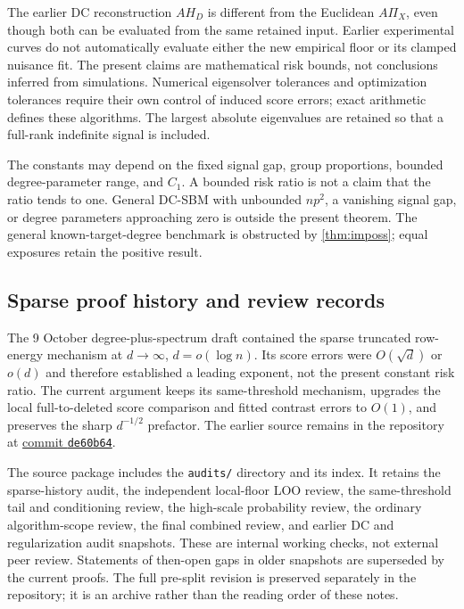 The earlier DC reconstruction $AH_D$ is different from the Euclidean
$A\Pi_X$, even though both can be evaluated from the same retained
input. Earlier experimental curves do not automatically evaluate either
the new empirical floor or its clamped nuisance fit. The present claims
are mathematical risk bounds, not conclusions inferred from simulations.
Numerical eigensolver tolerances and optimization tolerances require their
own control of induced score errors; exact arithmetic defines these
algorithms. The largest absolute eigenvalues are retained so that a
full-rank indefinite signal is included.

The constants may depend on the fixed signal gap, group proportions,
bounded degree-parameter range, and $C_1$. A bounded risk ratio is not
a claim that the ratio tends to one. General DC-SBM with unbounded
$np^2$, a vanishing signal gap, or degree parameters approaching zero
is outside the present theorem. The general known-target-degree
benchmark is obstructed by \cref{thm:imposs}; equal exposures retain
the positive result.

\subsection{Sparse proof history and review records}
The 9 October degree-plus-spectrum draft contained the sparse truncated
row-energy mechanism at $d\to\infty$, $d=o(\log n)$. Its score errors
were $O(\sqrt d)$ or $o(d)$ and therefore established a leading exponent,
not the present constant risk ratio. The current argument keeps its
same-threshold mechanism, upgrades the local full-to-deleted score
comparison and fitted contrast errors to $O(1)$, and preserves the sharp
$d^{-1/2}$ prefactor. The earlier source remains in the repository at
\href{https://github.com/zhixin0825/spectral-lrt/blob/de60b64c7d7f127ae6dc1d010c840af707a080da/paper/previous_draft/sbm_spectral_lrt_20261009.tex}{commit \texttt{de60b64}}.

The source package includes the \texttt{audits/} directory and its index.
It retains the sparse-history audit, the independent local-floor LOO
review, the same-threshold tail and conditioning review, the high-scale
probability review, the ordinary algorithm-scope review, the final
combined review, and earlier DC and regularization audit snapshots.
These are internal working checks, not external peer review. Statements
of then-open gaps in older snapshots are superseded by the current
proofs. The full pre-split revision is preserved separately in the
repository; it is an archive rather than the reading order of these notes.

